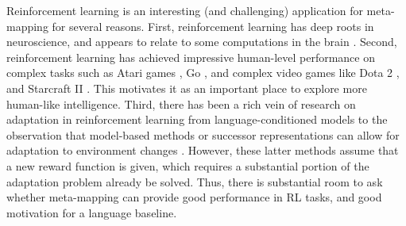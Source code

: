 Reinforcement learning is an interesting (and challenging) application for meta-mapping for several reasons. First, reinforcement learning has deep roots in neuroscience, and appears to relate to some computations in the brain \citep{Sutton2017, Niv2009, Odoherty2003}. Second, reinforcement learning has achieved impressive human-level performance on complex tasks such as Atari games \citep{Mni2015}, Go \citep{Silver2016, Silver2017}, and complex video games like Dota 2 \citep{OpenAI2019}, and Starcraft II \citep{Vinyals2019}. This motivates it as an important place to explore more human-like intelligence. Third, there has been a rich vein of research on adaptation in reinforcement learning from language-conditioned models \citep{Hermann2017} to the observation that model-based methods or successor representations can allow for adaptation to environment changes \citep{Daw2014, Momennejad2017}. However, these latter methods assume that a new reward function is given, which requires a substantial portion of the adaptation problem already be solved. Thus, there is substantial room to ask whether meta-mapping can provide good performance in RL tasks, and good motivation for a language baseline. \par 

